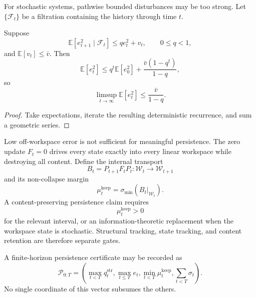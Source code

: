 
For stochastic systems, pathwise bounded disturbances may be too strong. Let
\(\{\mathcal F_t\}\) be a filtration containing the history through time
\(t\).

\begin{proposition}\label{prop:mean-square-persistence}
Suppose
\[
\mathbb E[e_{t+1}^2\mid\mathcal F_t]
\leq
q e_t^2+v_t,
\qquad
0\leq q<1,
\]
and \(\mathbb E[v_t]\leq\bar v\). Then
\[
\boxed{
\mathbb E[e_t^2]
\leq
q^t\mathbb E[e_0^2]
+
\frac{\bar v(1-q^t)}{1-q},
}
\]
so
\[
\limsup_{t\to\infty}\mathbb E[e_t^2]
\leq
\frac{\bar v}{1-q}.
\]
\end{proposition}

\begin{proof}
Take expectations, iterate the resulting deterministic recurrence, and sum a
geometric series.
\end{proof}


Low off-workspace error is not sufficient for meaningful persistence. The
zero update \(F_t=0\) drives every state exactly into every linear workspace
while destroying all content. Define the internal transport
\[
B_t=P_{t+1}F_tP_t:\mathcal W_t\longrightarrow\mathcal W_{t+1}
\]
and its non-collapse margin
\[
\boxed{
\mu_t^{\mathrm{keep}}
=
\sigma_{\min}(B_t|_{\mathcal W_t}).
}
\]
A content-preserving persistence claim requires
\[
\mu_t^{\mathrm{keep}}>0
\]
for the relevant interval, or an information-theoretic replacement when the
workspace state is stochastic. Structural tracking, state tracking, and
content retention are therefore separate gates.

A finite-horizon persistence certificate may be recorded as
\[
\boxed{
\mathcal P_{0:T}
=
\left(
\max_{t<T}q_t^{\mathrm{str}},
\max_{t\leq T}e_t,
\min_{t<T}\mu_t^{\mathrm{keep}},
\sum_{t<T}\sigma_t
\right).
}
\]
No single coordinate of this vector subsumes the others.


